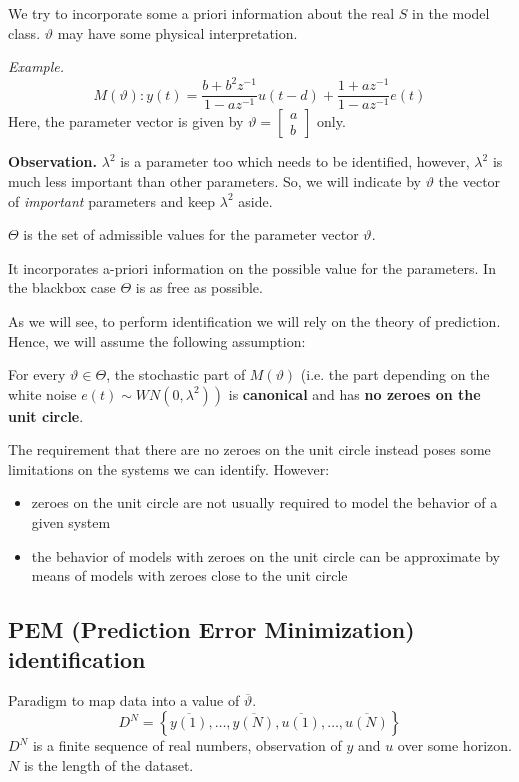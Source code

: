 We try to incorporate some a priori information about the real $S$ in the model class. $\vartheta$ may have some physical interpretation.

\emph{Example.}
$$
	M(\vartheta): y(t)=\frac{b+b^{2} z^{-1}}{1-a z^{-1}} u(t-d)+\frac{1+a z^{-1}}{1-a z^{-1}} e(t)
$$
Here, the parameter vector is given by $\vartheta=\begin{bmatrix}a \\ b\end{bmatrix}$ only.


\textbf{Observation.}
$\lambda^2$ is a parameter too which needs to be identified, however, $\lambda^2$ is much less important than other parameters. So, we will indicate by $\vartheta$ the vector of \emph{important} parameters and keep $\lambda^2$ aside.

$\Theta$ is the set of admissible values for the parameter vector $\vartheta$.

It incorporates a-priori information on the possible value for the parameters. In the blackbox case $\Theta$ is as free as possible.

As we will see, to perform identification we will rely on the theory of prediction. Hence, we will assume the following assumption:

For every $\vartheta \in \Theta$, the stochastic part of $M(\vartheta)$ (i.e. the part depending on the white noise $\left.e(t) \sim W N\left(0, \lambda^{2}\right)\right)$ is \textbf{canonical} and has \textbf{no zeroes on the unit circle}.

The requirement that there are no zeroes on the unit circle instead poses some limitations on the systems we can identify. However:
\begin{itemize}
	\item zeroes on the unit circle are not usually required to model the behavior of a given system
	\item the behavior of models with zeroes on the unit circle can be approximate by means of models with zeroes close to the unit circle
\end{itemize} 

\subsection{PEM (Prediction Error Minimization) identification}

Paradigm to map data into a value of $\overline{\vartheta}$.
$$
	D^N=\left\{\overline{y(1)},\ldots,\overline{y(N)},\overline{u(1)},\ldots,\overline{u(N)}\right\}
$$
$D^N$ is a finite sequence of real numbers, observation of $y$ and $u$ over some horizon. $N$ is the length of the dataset.

